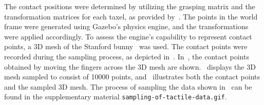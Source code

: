 The contact positions were determined by utilizing the grasping matrix  and the transformation matrices for each taxel, as provided by~\cite{ruppel-philipp-biotac-gazebo-plugin}. The points in the world frame  were generated using Gazebo's physics engine, and the transformations were applied accordingly. To assess the engine's capability to represent contact points, a 3D mesh of the Stanford bunny~\cite{stanford-bunny} was used. The contact points were recorded during the sampling process, as depicted in~. In~, the contact points obtained by moving the fingers across the 3D mesh are shown.~ displays the 3D mesh sampled to consist of \num{10 000} points, and~ illustrates both the contact points and the sampled 3D mesh. The process of sampling the data shown in~ can be found in the supplementary material \texttt{sampling-of-tactile-data.gif}.


